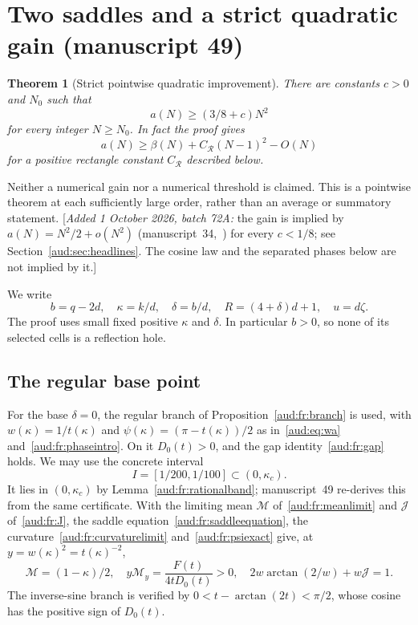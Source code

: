 \documentclass[11pt,a4paper]{article}
\numberwithin{equation}{section}
\newtheorem{theorem}{Theorem}[section]
\newcommand{\addednote}[1]{{\small[\textit{Added 1 October 2026, batch 72A:} #1]}}
\begin{document}
\section{Two saddles and a strict quadratic gain (manuscript 49)}\label{aud:sec:qg}

\begin{theorem}[Strict pointwise quadratic improvement]\label{aud:qg:main}
There are constants $c>0$ and $N_0$ such that
\begin{equation}\label{aud:qg:headline}
 a(N)\ge(3/8+c)N^2
\end{equation}
for every integer $N\ge N_0$. In fact the proof gives
\[
 a(N)\ge\beta(N)+C_{\mathcal R}(N-1)^2-O(N)
\]
for a positive rectangle constant $C_{\mathcal R}$ described below.
\end{theorem}

Neither a numerical gain nor a numerical threshold is claimed. This is a pointwise theorem at each sufficiently large order, rather than an average or summatory statement.
\addednote{the gain is implied by $a(N)=N^2/2+o(N^2)$ (manuscript~34,~\cite{pte}) for every $c<1/8$; see Section~\ref{aud:sec:headlines}. The cosine law and the separated phases below are not implied by it.}

We write
\begin{equation}\label{aud:qg:ratios}
 b=q-2d,\quad \kappa=k/d,\quad \delta=b/d,\quad
 R=(4+\delta)d+1,\quad u=d\zeta.
\end{equation}
The proof uses small fixed positive $\kappa$ and $\delta$. In particular $b>0$, so none of its selected cells is a reflection hole.
\subsection{The regular base point}\label{aud:sec:qgbase}
For the base $\delta=0$, the regular branch of Proposition~\ref{aud:fr:branch} is used, with $w(\kappa)=1/t(\kappa)$ and $\psi(\kappa)=(\pi-t(\kappa))/2$ as in~\eqref{aud:eq:wa} and~\eqref{aud:fr:phaseintro}. On it $D_0(t)>0$, and the gap identity~\eqref{aud:fr:gap} holds. We may use the concrete interval
\begin{equation}\label{aud:qg:I}
 I=[1/200,1/100]\subset(0,\kappa_c).
\end{equation}
It lies in $(0,\kappa_c)$ by Lemma~\ref{aud:fr:rationalband}; manuscript~49 re-derives this from the same certificate. With the limiting mean $\mathcal M$ of~\eqref{aud:fr:meanlimit} and $\mathcal J$ of~\eqref{aud:fr:J}, the saddle equation~\eqref{aud:fr:saddleequation}, the curvature~\eqref{aud:fr:curvaturelimit} and~\eqref{aud:fr:psiexact} give, at $y=w(\kappa)^2=t(\kappa)^{-2}$,
\begin{equation}\label{aud:qg:baseidentities}
 \mathcal M=(1-\kappa)/2,\quad
 y\mathcal M_y=\frac{F(t)}{4tD_0(t)}>0,\quad
 2w\arctan(2/w)+w\mathcal J=1.
\end{equation}
The inverse-sine branch is verified by $0<t-\arctan(2t)<\pi/2$, whose cosine has the positive sign of $D_0(t)$.
\end{document}
